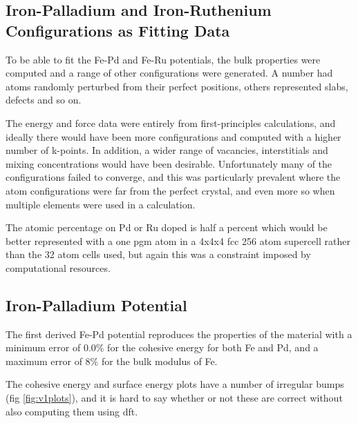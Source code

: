 \subsection{Iron-Palladium and Iron-Ruthenium Configurations as Fitting Data}

To be able to fit the Fe-Pd and Fe-Ru potentials, the bulk properties were computed and a range of other configurations were generated.  A number had atoms randomly perturbed from their perfect positions, others represented slabs, defects and so on.

The energy and force data were entirely from first-principles calculations, and ideally there would have been more configurations and computed with a higher number of k-points.  In addition, a wider range of vacancies, interstitials and mixing concentrations would have been desirable.  Unfortunately many of the configurations failed to converge, and this was particularly prevalent where the atom configurations were far from the perfect crystal, and even more so when multiple elements were used in a calculation.

The atomic percentage on Pd or Ru doped is half a percent which would be better represented with a one \acrshort{pgm} atom in a 4x4x4 \acrshort{fcc} 256 atom supercell rather than the 32 atom cells used, but again this was a constraint imposed by computational resources.


\subsection{Iron-Palladium Potential}

The first derived Fe-Pd potential reproduces the properties of the material with a minimum error of 0.0\% for the cohesive energy for both Fe and Pd, and a maximum error of 8\% for the bulk modulus of Fe.

The cohesive energy and surface energy plots have a number of irregular bumps (fig \ref{fig:v1plots}), and it is hard to say whether or not these are correct without also computing them using \acrshort{dft}.


